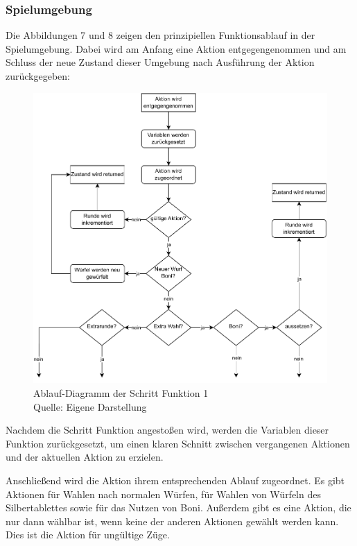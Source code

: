 \subsubsection{Spielumgebung}
Die Abbildungen 7 und 8 zeigen den prinzipiellen Funktionsablauf in der Spielumgebung. Dabei wird am Anfang eine Aktion entgegengenommen und am Schluss der neue Zustand dieser Umgebung nach Ausführung der Aktion zurückgegeben:
\nopagebreak
\begin{figure}[H]
	\includegraphics[width=1\textwidth]{Bilder/step3.drawio} 
	\caption[Ablauf-Diagramm der Schritt Funktion 1]{Ablauf-Diagramm der Schritt Funktion 1\\ Quelle: Eigene Darstellung}
\end{figure}	

Nachdem die Schritt Funktion angestoßen wird, werden die Variablen dieser Funktion zurückgesetzt, um einen klaren Schnitt zwischen vergangenen Aktionen und der aktuellen Aktion zu erzielen.

Anschließend wird die Aktion ihrem entsprechenden Ablauf zugeordnet. Es gibt Aktionen für Wahlen nach normalen Würfen, für Wahlen von Würfeln des Silbertablettes sowie für das Nutzen von Boni. Außerdem gibt es eine Aktion, die nur dann wählbar ist, wenn keine der anderen Aktionen gewählt werden kann. Dies ist die Aktion für ungültige Züge.

